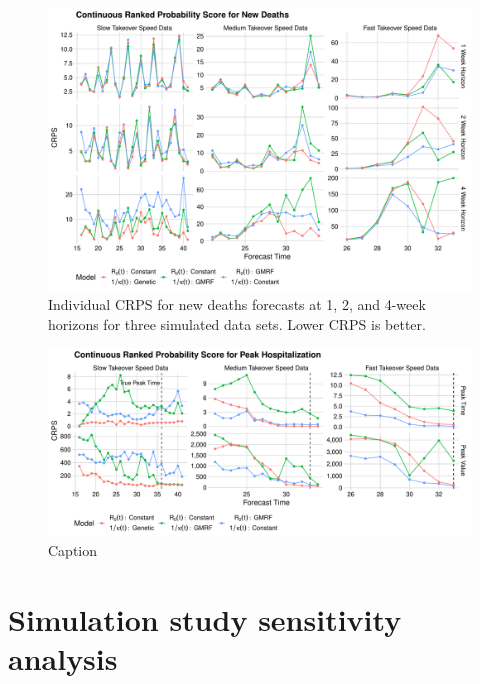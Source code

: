 \begin{figure}
    \centering
    \includegraphics[width=1.0\columnwidth]{simulated_crps_comparison_data_new_deaths_plot}
    \caption{Individual CRPS for new deaths forecasts at 1, 2, and 4-week horizons for three simulated data sets. Lower CRPS is better.}
    \label{ch_5:fig:simulated_crps_comparison_data_new_deaths_plot}
\end{figure}

\begin{figure}
    \centering
    \includegraphics[width=1.0\columnwidth]{simulated_peak_crps_plot}
    \caption{Caption}
    \label{ch_5:fig:simulated_peak_crps_plot}
\end{figure}

\section{Simulation study sensitivity analysis}
\label{ch_5:sec:sim_sensitivity}

